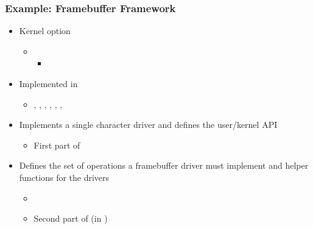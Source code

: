 \begin{frame}
  \frametitle{Example: Framebuffer Framework}
  \begin{itemize}
  \item Kernel option 
    \begin{itemize}
    \item {}
      \begin{itemize}
      \item {}
      \end{itemize}
    \end{itemize}
  \item Implemented in 
    \begin{itemize}
    \item {}, , ,
      , , ,
    \end{itemize}
  \item Implements a single character driver and defines the
    user/kernel API
    \begin{itemize}
    \item First part of 
    \end{itemize}
  \item Defines the set of operations a framebuffer driver must
    implement and helper functions for the drivers
    \begin{itemize}
    \item {}
    \item Second part of  (in
      )
    \end{itemize}
  \end{itemize}
\end{frame}

